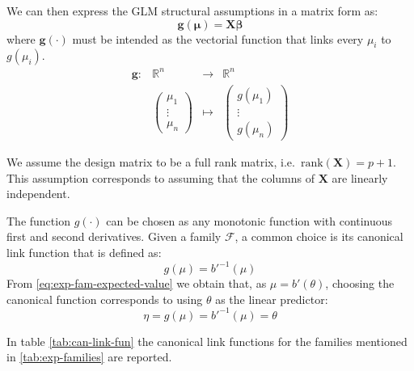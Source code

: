 \documentclass[a4paper, nobind]{templates/ociamthesis}
\theoremstyle{definition}
\theoremstyle{definition}
\theoremstyle{definition}
\theoremstyle{remark}
\begin{document}
We can then express the GLM structural assumptions in a matrix form as:
\[
\boldsymbol{g}(\boldsymbol{\mu}) = \boldsymbol{X} \boldsymbol{\beta}
\]
where \(\boldsymbol{g}(\cdot)\) must be intended as the vectorial function that links every \(\mu_i\) to \(g(\mu_i)\).
\[
\begin{array}{cccc}
\boldsymbol{g}: & \mathbb{R}^n & \longrightarrow & \mathbb{R}^n \\
                & \left(
                    \begin{matrix} \mu_1  \\ \vdots \\ \mu_n \end{matrix}
                  \right)
                  & \longmapsto & 
                  \left(
                    \begin{matrix} g(\mu_1)  \\ \vdots \\ g(\mu_n) \end{matrix}
                  \right)
\end{array}
\]

We assume the design matrix to be a full rank matrix, i.e.~\(\text{rank}(\boldsymbol{X}) = p+1\). This assumption corresponds to assuming that the columns of \(\boldsymbol{X}\) are linearly independent.

The function \(g(\cdot)\) can be chosen as any monotonic function with continuous first and second derivatives. Given a family \(\mathcal{F}\), a common choice is its canonical link function that is defined as:
\[
g(\mu) = b'^{-1}(\mu)
\]
From \eqref{eq:exp-fam-expected-value} we obtain that, as \(\mu = b'(\theta)\), choosing the canonical function corresponds to using \(\theta\) as the linear predictor:
\[
\eta = g(\mu) = b'^{-1}(\mu) = \theta
\]

In table \ref{tab:can-link-fun} the canonical link functions for the families mentioned in \ref{tab:exp-families} are reported.
\end{document}
